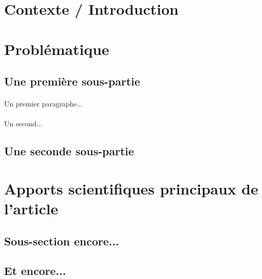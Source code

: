 \documentclass[a4paper, 12pt]{article}
\begin{document}
\newpage		
\tableofcontents %



\clearpage 

\section{Contexte / Introduction}

\cite{AC-IoT}



\clearpage 
\section{Problématique}

\subsection{Une première sous-partie}
\paragraph{}
Un premier paragraphe...
\paragraph{}
Un second...

\subsection{Une seconde sous-partie}

\clearpage 
\section{Apports scientifiques principaux de l’article}
\subsection{Sous-section encore...}
\subsection{Et encore...}
\end{document}
